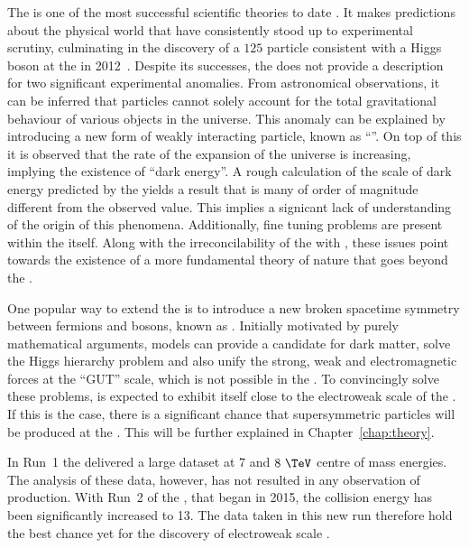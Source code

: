 The \SM is one of the most successful scientific theories to date
\cite{Salam:1964ry,Glashow:1961tr,PhysRevLett.19.1264}. It makes
predictions about the physical world that have consistently stood up
to experimental scrutiny, culminating in the discovery of a $125$\gev
particle consistent with a Higgs boson at the \LHC in
2012~\cite{1207.7214,1207.7235}.  Despite its successes, the \SM does
not provide a description for two significant experimental anomalies.
From astronomical observations, it can be inferred that \SM particles
cannot solely account for the total gravitational behaviour of various
objects in the universe. This anomaly can be explained by introducing
a new form of weakly interacting particle, known as ``\DM''. On top of
this it is observed that the rate of the expansion of the universe is
increasing, implying the existence of ``dark energy''. A rough
calculation of the scale of dark energy predicted by the \SM yields a
result that is many of order of magnitude different from the observed
value. This implies a signicant lack of understanding of the origin of
this phenomena.  Additionally, fine tuning problems are present within
the \SM itself.  Along with the irreconcilability of the \SM with \GR,
these issues point towards the existence of a more fundamental theory
of nature that goes beyond the \SM. 

One popular way to extend the \SM is to introduce a new broken
spacetime symmetry between fermions and bosons, known as
\SUSY. Initially motivated by purely mathematical arguments, \SUSY
models can provide a candidate for dark matter, solve the Higgs
hierarchy problem and also unify the strong, weak and electromagnetic
forces at the ``GUT'' scale, which is not possible in the \SM. To
convincingly solve these problems, \SUSY is expected to exhibit itself
close to the electroweak scale of the \SM. If this is the case, there
is a significant chance that supersymmetric particles will be produced
at the \LHC. This will be further explained in
Chapter~\ref{chap:theory}.

In Run~1 the \LHC delivered a large dataset at $7$ and $8~\tev$ centre
of mass energies. The analysis of these data, however, has not
resulted in any observation of \SUSY production. With Run~2 of the
\LHC, that began in 2015, the collision energy has been significantly
increased to 13\tev. The data taken in this new run therefore hold the
best chance yet for the discovery of electroweak scale \SUSY.

